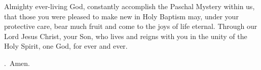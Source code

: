 \lettrine[lines=3]{A}{}lmighty ever-living God,
constantly accomplish the Paschal Mystery within us,
that those you were pleased to make new in Holy Baptism
may, under your protective care, bear much fruit
and come to the joys of life eternal.
Through our Lord Jesus Christ, your Son,
who lives and reigns with you in the unity of the Holy Spirit,
one God, for ever and ever.
\par \Rbar.~Amen.
